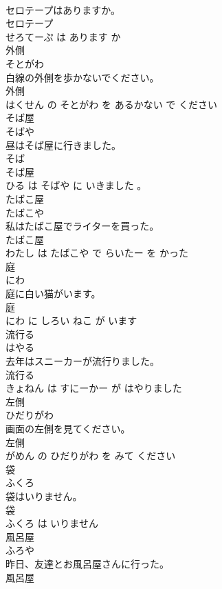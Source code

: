 \documentclass[8pt]{extreport}
\begin{document}
\begin{CJK}{UTF8}{min}
\\	セロテープはありますか。	
\\	セロテープ 
\\	せろてーぷ は あります か			
\\	外側	
\\	そとがわ			
\\	白線の外側を歩かないでください。	
\\	外側 
\\	はくせん の そとがわ を あるかない で ください			
\\	そば屋	
\\	そばや			
\\	昼はそば屋に行きました。	
\\	そば 
\\	そば屋 
\\	ひる は そばや に いきました 。			
\\	たばこ屋	
\\	たばこや			
\\	私はたばこ屋でライターを買った。	
\\	たばこ屋 
\\	わたし は たばこや で らいたー を かった			
\\	庭	
\\	にわ			
\\	庭に白い猫がいます。	
\\	庭 
\\	にわ に しろい ねこ が います			
\\	流行る	
\\	はやる			
\\	去年はスニーカーが流行りました。	
\\	流行る 
\\	きょねん は すにーかー が はやりました			
\\	左側	
\\	ひだりがわ			
\\	画面の左側を見てください。	
\\	左側 
\\	がめん の ひだりがわ を みて ください			
\\	袋	
\\	ふくろ			
\\	袋はいりません。	
\\	袋 
\\	ふくろ は いりません			
\\	風呂屋	
\\	ふろや			
\\	昨日、友達とお風呂屋さんに行った。	
\\	風呂屋 

\end{CJK}
\end{document}
